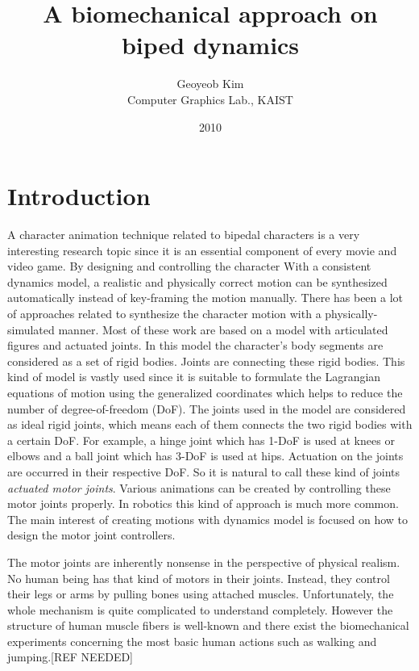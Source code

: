 \documentclass[a4paper,10pt]{article}
\begin{document}
\title{A biomechanical approach on biped dynamics}

\author{Geoyeob Kim\\
Computer Graphics Lab., KAIST
}
\date{2010}
\maketitle



\section{Introduction}
A character animation technique related to bipedal characters is
a very interesting research topic since it is an essential component
of every movie and video game. By designing and controlling the character
With a consistent dynamics model, a realistic and physically correct
motion can be synthesized automatically instead of key-framing the motion
manually. There has been a lot of approaches related to
synthesize the character motion with a physically-simulated manner.
Most of these work are based on a model with articulated figures and
actuated joints. In this model the character's body segments are considered
as a set of rigid bodies. Joints are connecting these rigid bodies.
This kind of model is
vastly used since it is suitable to formulate the Lagrangian equations of motion
using the generalized coordinates which helps to reduce the number of degree-of-freedom (DoF).
The joints used in the model are considered as ideal rigid joints, which means
each of them connects the two rigid bodies with a certain DoF. For example,
a hinge joint which has 1-DoF is used at knees or elbows and a ball joint
which has 3-DoF is used at hips. Actuation on the joints are occurred
in their respective DoF. So it is natural to call these kind of joints
\emph{actuated motor joints}. Various animations can be created by controlling these motor joints properly. In robotics this kind of approach is much more
common. The main interest of creating motions with dynamics model is focused on how to design the motor joint controllers.


The motor joints are inherently nonsense in the perspective of
physical realism. No human being has that kind of motors in their joints.
Instead, they control their legs or arms by pulling bones using attached
muscles. Unfortunately, the whole mechanism is quite complicated to understand completely.
However the structure of human muscle fibers is well-known and there exist the biomechanical experiments concerning the most basic human actions such as walking and jumping.[REF NEEDED]
\end{document}
